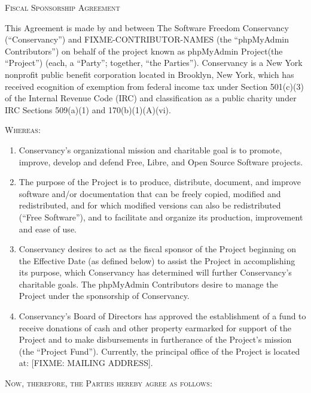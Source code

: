 \documentclass[letterpaper,12pt]{article}
\newcommand{\projectname}{phpMyAdmin Project\xspace}
\newcommand{\signatories}{phpMyAdmin Contributors\xspace}
\begin{document}
\begin{center}
\textsc{\Huge Fiscal Sponsorship Agreement}{\Huge {} } 
\par\end{center}

\bigskip{}


This Agreement is made by and between The Software Freedom Conservancy
(``Conservancy'') and FIXME-CONTRIBUTOR-NAMES (the ``\signatories'')
on behalf of the project known as \projectname (the ``Project'') (each, a 
``Party''; together, ``the Parties'').  Conservancy is a New York nonprofit 
public benefit corporation located in Brooklyn, New York, which has received 
ecognition of exemption from federal income tax under Section 501(c)(3) of 
the Internal Revenue Code (IRC) and classification as a public charity under 
IRC Sections 509(a)(1) and 170(b)(1)(A)(vi).

\textsc{Whereas:}

\begin{enumerate}[label=\Alph*.,ref=\S \Alph*]
\item Conservancy's organizational mission and charitable goal is to promote,
improve, develop and defend Free, Libre, and Open Source Software
projects. 
\item The purpose of the Project is to produce, distribute, document, and
improve software and/or documentation that can be freely copied, modified and redistributed,
and for which modified versions can also be redistributed (``Free Software''),
and to facilitate and organize its production, improvement and ease
of use. 
\item Conservancy desires to act as the fiscal sponsor of the Project beginning
on the Effective Date (as defined below) to assist the Project in
accomplishing its purpose, which Conservancy has determined will further
Conservancy's charitable goals. The \signatories desire to manage
the Project under the sponsorship of Conservancy. 
\item Conservancy's Board of Directors has approved the establishment
of a fund to receive donations of cash and other property earmarked
for support of the Project and to make disbursements in furtherance
of the Project's mission (the ``Project Fund''). Currently, the
principal office of the Project is located at: [FIXME: MAILING ADDRESS]. 
\end{enumerate}
\medskip{}


\textsc{Now, therefore, the Parties hereby agree as follows:}
\end{document}
